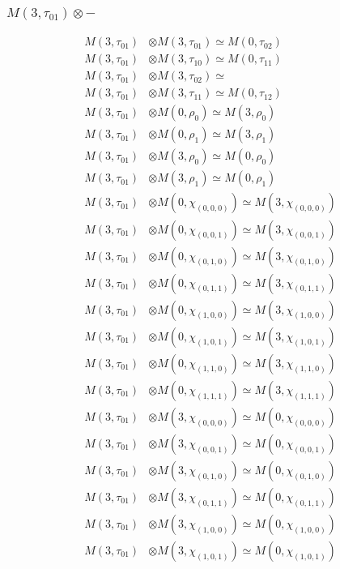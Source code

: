 \subsubsection{$ M(3,\tau_{01})\otimes -$}
\begin{align*}
M(3,\tau_{01}) &\otimes M(3,\tau_{01}) \simeq M(0,\tau_{02}) \\
M(3,\tau_{01}) &\otimes M(3,\tau_{10}) \simeq M(0,\tau_{11}) \\
M(3,\tau_{01}) &\otimes M(3,\tau_{02}) \simeq  \\
M(3,\tau_{01}) &\otimes M(3,\tau_{11}) \simeq M(0,\tau_{12}) \\
M(3,\tau_{01}) &\otimes M(0,\rho_{0}) \simeq M(3,\rho_{0}) \\
M(3,\tau_{01}) &\otimes M(0,\rho_{1}) \simeq M(3,\rho_{1}) \\
M(3,\tau_{01}) &\otimes M(3,\rho_{0}) \simeq M(0,\rho_{0}) \\
M(3,\tau_{01}) &\otimes M(3,\rho_{1}) \simeq M(0,\rho_{1}) \\
M(3,\tau_{01}) &\otimes M(0,\chi_{(0,0,0)}) \simeq M(3,\chi_{(0,0,0)}) \\
M(3,\tau_{01}) &\otimes M(0,\chi_{(0,0,1)}) \simeq M(3,\chi_{(0,0,1)}) \\
M(3,\tau_{01}) &\otimes M(0,\chi_{(0,1,0)}) \simeq M(3,\chi_{(0,1,0)}) \\
M(3,\tau_{01}) &\otimes M(0,\chi_{(0,1,1)}) \simeq M(3,\chi_{(0,1,1)}) \\
M(3,\tau_{01}) &\otimes M(0,\chi_{(1,0,0)}) \simeq M(3,\chi_{(1,0,0)}) \\
M(3,\tau_{01}) &\otimes M(0,\chi_{(1,0,1)}) \simeq M(3,\chi_{(1,0,1)}) \\
M(3,\tau_{01}) &\otimes M(0,\chi_{(1,1,0)}) \simeq M(3,\chi_{(1,1,0)}) \\
M(3,\tau_{01}) &\otimes M(0,\chi_{(1,1,1)}) \simeq M(3,\chi_{(1,1,1)}) \\
M(3,\tau_{01}) &\otimes M(3,\chi_{(0,0,0)}) \simeq M(0,\chi_{(0,0,0)}) \\
M(3,\tau_{01}) &\otimes M(3,\chi_{(0,0,1)}) \simeq M(0,\chi_{(0,0,1)}) \\
M(3,\tau_{01}) &\otimes M(3,\chi_{(0,1,0)}) \simeq M(0,\chi_{(0,1,0)}) \\
M(3,\tau_{01}) &\otimes M(3,\chi_{(0,1,1)}) \simeq M(0,\chi_{(0,1,1)}) \\
M(3,\tau_{01}) &\otimes M(3,\chi_{(1,0,0)}) \simeq M(0,\chi_{(1,0,0)}) \\
M(3,\tau_{01}) &\otimes M(3,\chi_{(1,0,1)}) \simeq M(0,\chi_{(1,0,1)}) \\

\end{align*}
